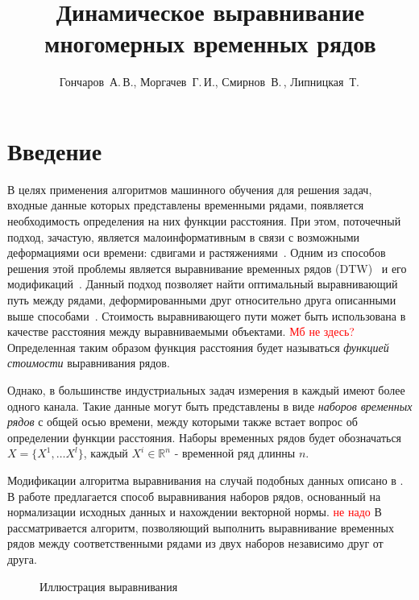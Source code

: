 \documentclass[12pt,twoside]{article}
\title
        {Динамическое выравнивание многомерных временных рядов}
\author
        {Гончаров~А.\,В., Моргачев~Г.\,И., Смирнов~В.\,, Липницкая~Т.\,} %
\newcommand{\fixme}[1]{\textcolor{red}{#1}}
\begin{document}
    \maketitle
    \setcounter{secnumdepth}{3}
    \section{Введение}\label{intro}
        
        В целях применения алгоритмов машинного обучения для решения задач, входные данные которых представлены временными рядами, появляется необходимость определения на них функции расстояния. При этом, поточечный подход, зачастую, является малоинформативным в связи с возможными деформациями оси времени: сдвигами и растяжениями~\cite{01f4ab11a9ff49ff909094a135dcfe33}.
        Одним из способов решения этой проблемы является выравнивание временных рядов (DTW)~\cite{Keogh:1999:SUD:645803.669511} и его модификаций~\cite{journals/ida/SalvadorC07,Keogh01derivativedynamic}.
        Данный подход позволяет найти оптимальный выравнивающий путь между рядами, деформированными друг относительно друга описанными выше способами~\cite{salvador2004fastdtw}. Стоимость выравнивающего пути может быть использована в качестве расстояния между выравниваемыми объектами. \fixme{Мб не здесь?} Определенная таким образом функция расстояния будет называться \textit{функцией стоимости} выравнивания рядов.
        
        Однако, в большинстве индустриальных задач измерения в каждый имеют более одного канала. Такие данные могут быть представлены в виде \textit{наборов временных рядов} с общей осью времени, между которыми также встает вопрос об определении функции расстояния. Наборы временных рядов будет обозначаться $X = \{X^1,\dots X^l\}$, каждый $X^i \in \mathbb{R}^{n}$ \-- временной ряд длинны $n$.
        
        Модификации алгоритма выравнивания на случай подобных данных описано в \cite{Holt2007,Sanguansat2012MultipleMS}.
        В работе \cite{Holt2007} предлагается способ выравнивания наборов рядов, основанный на нормализации исходных данных и нахождении векторной нормы.
        \fixme{не надо} В \cite{Sanguansat2012MultipleMS} рассматривается алгоритм, позволяющий выполнить выравнивание временных рядов между соответственными рядами из двух наборов независимо друг от друга.
        
        \begin{figure}[h!]
            \centering
            \resizebox{0.95\textwidth}{!}{}
            \caption{Иллюстрация выравнивания}\label{example}
        \end{figure}
        
\end{document}
